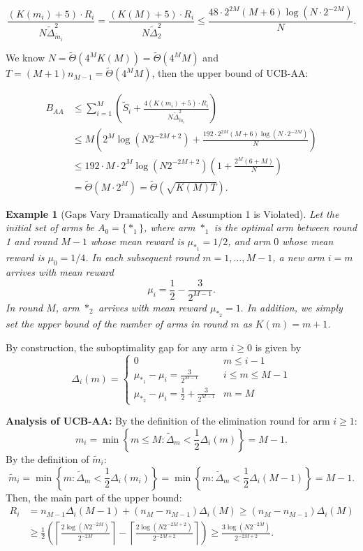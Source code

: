 \documentclass[11pt]{article}
\newtheorem{example}{Example}
\begin{document}
$$ \frac{(K(m_i)+5)\cdot R_i}{N\tilde{\Delta}_{\tilde{m}_i}^2} = \frac{(K(M)+5)\cdot R_i}{N\tilde{\Delta}_{2}^2}\leq \frac{48\cdot 2^{2M}(M+6)\log (N \cdot 2^{-2M})}{N} .$$

We know $N=\tilde{\Theta}(4^MK(M))=\tilde{\Theta}(4^MM)$ and $T = (M+1)n_{M-1}=\tilde{\Theta}(4^MM)$, then the upper bound of UCB-AA:

$$\begin{aligned}
B_{AA} &\le  \sum_{i=1}^{M}   \left( \tilde{S}_i+\frac{4\left(K(m_i)+5\right)\cdot R_i}{N\tilde{\Delta}_{\tilde{m}_i}^2}\right) \\
&\le  M \left( 2^{M} \log(N 2^{-2M+2})+\frac{192\cdot  2^{2M}(M+6)\log (N \cdot 2^{-2M})}{N}\right)\\
&\le 192\cdot M \cdot  2^{M} \log(N 2^{-2M+2})\left(1+\frac{2^M(6+M)}{N}\right) \\
& = \tilde{\Theta }\left( M \cdot  2^{M} \right) = \tilde{\Theta }\left(  \sqrt{K(M)T} \right).
\end{aligned}$$





\begin{example}[Gaps Vary Dramatically and Assumption 1 is Violated]
\label{Example 5}
Let the initial set of arms be $A_0 = \{*_1\}$, where arm $*_1$ is the optimal arm between round 1 and round $M-1$ whose mean reward is $\mu_{*_1} = 1/2$, and arm $0$ whose mean reward is $\mu_0 = 1/4$. In each subsequent round $m=1, \dots, M-1$, a new arm $i=m$ arrives with mean reward 
$$\mu_i = \frac{1}{2} - \frac{3}{2^{M-1}}.$$ In round $M$, arm $*_2$ arrives with mean reward $\mu_{*_2} =1.$
In addition, we simply set the upper bound of the number of arms in round $m$ as $K(m)=m+1$.
\end{example}

By construction, the suboptimality gap for any arm $i \ge 0$ is given by 
\[\Delta_i(m)=\begin{cases}
      0        & m\leq i-1\\
    \mu_{*_1} - \mu_i = \frac{3}{2^{M-1}}  & i\leq m\leq M-1\\
    \mu_{*_2} - \mu_i = \frac{1}{2} +\frac{3}{2^{M-1}}&m=M 
\end{cases}\]


\textbf{Analysis of UCB-AA:} 
By the definition of the elimination round for arm $i \geq1$:
$$m_i = \min \left\{ m \leq M : \tilde{\Delta}_m < \frac{1}{2}\Delta_i(m) \right\}=M-1.$$
By the definition of $\tilde{m}_i$:
$$ \tilde{m}_{i} = \min\left\{ m: \tilde{\Delta}_{m} < \frac{1}{2}\Delta_{i}(m_i) \right\}=\min\left\{ m: \tilde{\Delta}_{m} < \frac{1}{2}\Delta_{i}(M-1) \right\}=M-1.$$
Then, the main part of the upper bound: 
\begin{align*}
    R_i &= n_{M-1}\Delta_i(M-1)+(n_{M} -n_{M-1})\Delta_i(M) \geq  (n_{M} -n_{M-1})\Delta_i(M) \\
     &\geq \frac{1}{2} \left(\left\lceil \frac{2 \log(N 2^{-2M})}{2^{-2M}} \right\rceil  - \left\lceil \frac{2 \log(N 2^{-2M+2})}{2^{-2M+2}} \right\rceil \right) \geq  \frac{ 3\log(N 2^{-2M})}{2^{-2M+2}} .
\end{align*}
\end{document}
